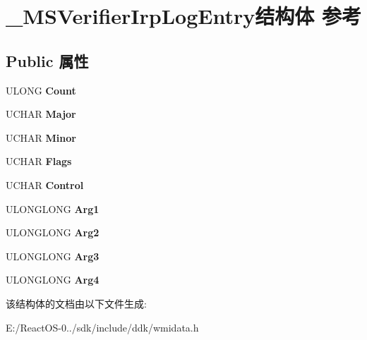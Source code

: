 \hypertarget{struct___m_s_verifier_irp_log_entry}{}\section{\+\_\+\+M\+S\+Verifier\+Irp\+Log\+Entry结构体 参考}
\label{struct___m_s_verifier_irp_log_entry}
\subsection*{Public 属性}
\begin{DoxyCompactItemize}
\item 
\mbox{\label{struct___m_s_verifier_irp_log_entry_a1fef9b8a25438279d95285b5ca253d2c}} 
U\+L\+O\+NG {\bfseries Count}
\item 
\mbox{\label{struct___m_s_verifier_irp_log_entry_ae588d10f8fed1800127821dffec5da9d}} 
U\+C\+H\+AR {\bfseries Major}
\item 
\mbox{\label{struct___m_s_verifier_irp_log_entry_a12bee4d736fcaf79ac58990d73132ef5}} 
U\+C\+H\+AR {\bfseries Minor}
\item 
\mbox{\label{struct___m_s_verifier_irp_log_entry_a502573795b9192da13ec9ae9760ae71f}} 
U\+C\+H\+AR {\bfseries Flags}
\item 
\mbox{\label{struct___m_s_verifier_irp_log_entry_a89eeac159c36e8e4c30d1276ed1d809b}} 
U\+C\+H\+AR {\bfseries Control}
\item 
\mbox{\label{struct___m_s_verifier_irp_log_entry_a3dde8139217dee2e382682ec177afbc7}} 
U\+L\+O\+N\+G\+L\+O\+NG {\bfseries Arg1}
\item 
\mbox{\label{struct___m_s_verifier_irp_log_entry_a1f23fbee6bf6190d72c9a39854e442d0}} 
U\+L\+O\+N\+G\+L\+O\+NG {\bfseries Arg2}
\item 
\mbox{\label{struct___m_s_verifier_irp_log_entry_abdd1fc941a5f226d0fe1b5516e1dbe40}} 
U\+L\+O\+N\+G\+L\+O\+NG {\bfseries Arg3}
\item 
\mbox{\label{struct___m_s_verifier_irp_log_entry_a9e3c6723b89b8c89fb798f08fee74765}} 
U\+L\+O\+N\+G\+L\+O\+NG {\bfseries Arg4}
\end{DoxyCompactItemize}


该结构体的文档由以下文件生成\+:\begin{DoxyCompactItemize}
\item 
E\+:/\+React\+O\+S-\/0../sdk/include/ddk/wmidata.\+h\end{DoxyCompactItemize}
